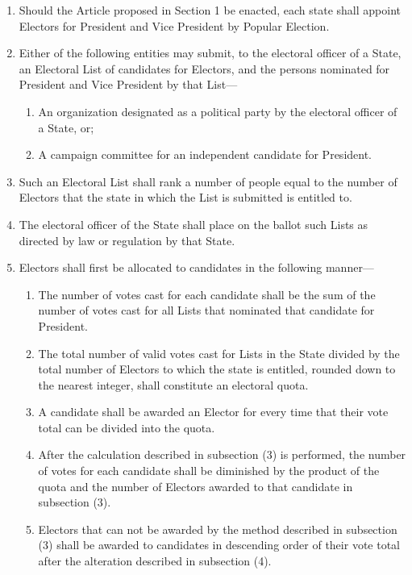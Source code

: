 \documentclass{article}
\begin{document}
    \begin{enumerate}
        \item Should the Article proposed in Section 1 be enacted, each state shall appoint Electors for President and Vice President by Popular Election. 
        \item Either of the following entities may submit, to the electoral officer of a State, an Electoral List of candidates for Electors, and the persons nominated for President and Vice President by that List---
        \begin{enumerate}
            \item An organization designated as a political party by the electoral officer of a State, or;
            \item A campaign committee for an independent candidate for President.
        \end{enumerate}
        \item Such an Electoral List shall rank a number of people equal to the number of Electors that the state in which the List is submitted is entitled to. 
        \item The electoral officer of the State shall place on the ballot such Lists as directed by law or regulation by that State. 
        \item Electors shall first be allocated to candidates in the following manner---
        \begin{enumerate}
            \item The number of votes cast for each candidate shall be the sum of the number of votes cast for all Lists that nominated that candidate for President.
            \item The total number of valid votes cast for Lists in the State divided by the total number of Electors to which the state is entitled, rounded down to the nearest integer, shall constitute an electoral quota.
            \item A candidate shall be awarded an Elector for every time that their vote total can be divided into the quota.
            \item After the calculation described in subsection (3) is performed, the number of votes for each candidate shall be diminished by the product of the quota and the number of Electors awarded to that candidate in subsection (3).
            \item Electors that can not be awarded by the method described in subsection (3) shall be awarded to candidates in descending order of their vote total after the alteration described in subsection (4).

\end{enumerate}
\end{enumerate}
\end{document}

